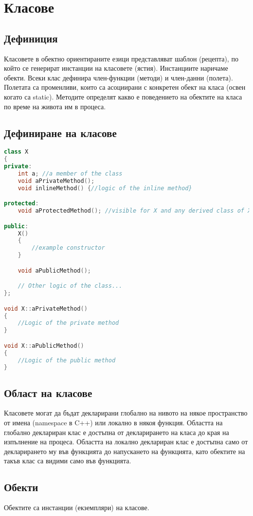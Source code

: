 \documentclass[fleqn,12pt]{article}
\begin{document}
\section{Класове}
\subsection{Дефиниция}
Класовете в обектно ориентираните езици представляват шаблон (рецепта), по който се генерират инстанции на класовете (ястия).
Инстанциите наричаме обекти.
Всеки клас дефинира член-функции (методи) и член-данни (полета).
Полетата са променливи, които са асоциирани с конкретен обект на класа (освен когато са static).
Методите определят какво е поведението на обектите на класа по време на живота им в процеса.


\subsection{Дефиниране на класове}
\begin{lstlisting}[language=C++, caption=Example skeletal definition of a class]
class X
{
private:
    int a; //a member of the class
    void aPrivateMethod();
    void inlineMethod() {//logic of the inline method}

protected:
    void aProtectedMethod(); //visible for X and any derived class of X

public:
    X() 
    {
        //example constructor
    }

    void aPublicMethod();

    // Other logic of the class...
};

void X::aPrivateMethod()
{
    //Logic of the private method
}

void X::aPublicMethod()
{
    //Logic of the public method
}  
\end{lstlisting}


\subsection{Област на класове}
Класовете могат да бъдат декларирани глобално на нивото на някое пространство от имена (namespace в C++) или локално в някоя функция.
Областта на глобално деклариран клас е достъпна от декларирането на класа до края на изпълнение на процеса.
Областта на локално деклариран клас е достъпна само от декларирането му във функцията до напускането на функцията, като обектите на такъв клас са видими само във функцията.

\subsection{Обекти}
Обектите са инстанции (екземпляри) на класове.
\end{document}
